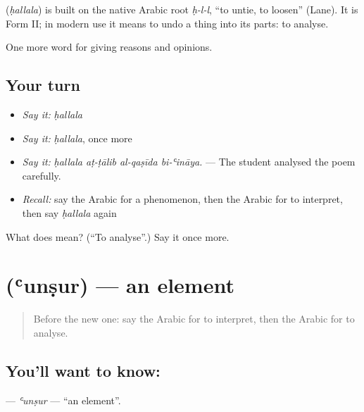\begin{cousinweb}
\textbf{} (\emph{ḥallala}) is built on the native Arabic root \emph{ḥ-l-l}, \textquotedblleft{}to untie, to loosen\textquotedblright{} (Lane). It is Form II; in modern use it means to undo a thing into its parts: to analyse.
\end{cousinweb}

\begin{grammarlens}[title={What you've built}]
One more word for giving reasons and opinions.
\end{grammarlens}

\subsection*{Your turn}
\begin{itemize}
\raggedright
  \item \emph{Say it:} \emph{ḥallala}
  \item \emph{Say it:} \emph{ḥallala}, once more
  \item \emph{Say it:} \emph{ḥallala aṭ-ṭālib al-qaṣīda bi-ʿināya.} — The student analysed the poem carefully.
  \item \emph{Recall:} say the Arabic for a phenomenon, then the Arabic for to interpret, then say \emph{ḥallala} again
\end{itemize}

\begin{tcolorbox}[breakable,colback=teal!4,colframe=teal!35!black,title={Before you move on}]
What does  mean? (\textquotedblleft{}To analyse\textquotedblright{}.) Say it once more.
\end{tcolorbox}
\section[\texorpdfstring{\ar{عنصر} (ʿunṣur)}{عنصر (ʿunṣur)}]{ (ʿunṣur) — an element}

\label{lesson:AR-C364-unsur}



\begin{quote}
Before the new one: say the Arabic for to interpret, then the Arabic for to analyse.
\end{quote}

\subsection*{You'll want to know: }
\textbf{} — \emph{ʿunṣur} — \textquotedblleft{}an element\textquotedblright{}.

